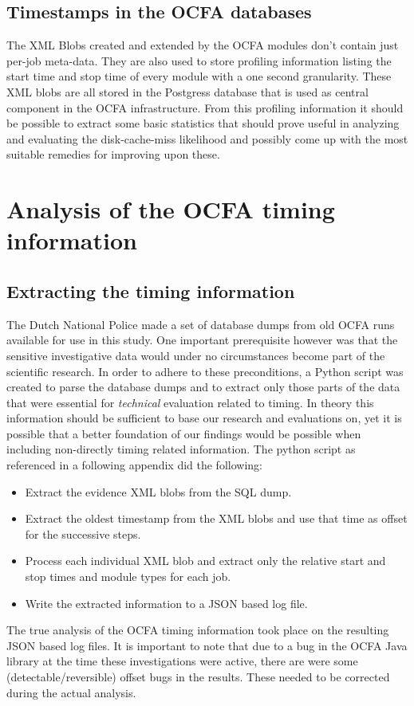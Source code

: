 \subsection{Timestamps in the OCFA databases}
The XML Blobs created and extended by the OCFA modules don't contain just per-job meta-data. They are also used to store profiling information listing the start time and stop time of every module with a one second granularity.  These XML blobs are all stored in the Postgress database that is used as central component in the OCFA infrastructure. From this profiling information it should be possible to extract some basic statistics that should prove useful in analyzing and evaluating the disk-cache-miss likelihood and possibly come up with the most suitable remedies for improving upon these.
\section{Analysis of the OCFA timing information}
\subsection{Extracting the timing information}
The Dutch National Police made a set of database dumps from old OCFA runs available for use in this study. One important prerequisite however was that the sensitive investigative data would under no circumstances become part of the scientific research. In order to adhere to these preconditions, a Python script was created to parse the database dumps and to extract only those parts of the data that were essential for \emph{technical} evaluation related to timing. In theory this information should be sufficient to base our research and evaluations on, yet it is possible that a better foundation of our findings would be possible when including non-directly timing related information. The python script as referenced in a following appendix did the following:
\begin{itemize}
\item Extract the evidence XML blobs from the SQL dump.
\item Extract the oldest timestamp from the XML blobs and use that time as offset for the successive steps.
\item Process each individual XML blob and extract only the relative start and stop times and module types for each job.
\item Write the extracted information to a JSON based log file.
\end{itemize}
The true analysis of the OCFA timing information took place on the resulting JSON based log files. It is important to note that due to a bug in the OCFA Java library at the time these investigations were active, there are were some (detectable/reversible) offset bugs in the results. These needed to be corrected during the actual analysis.




